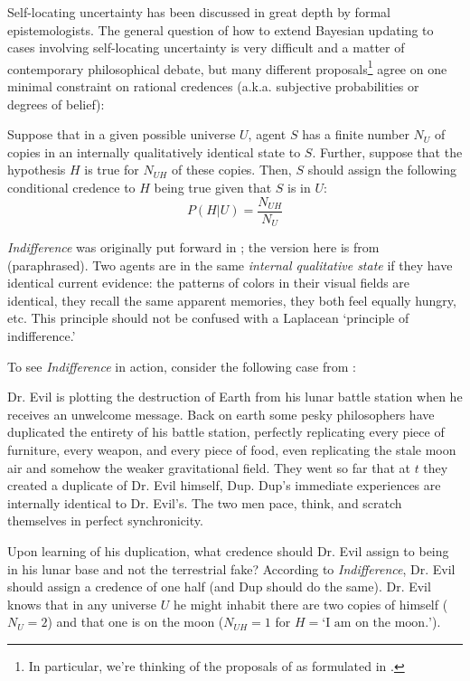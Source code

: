 \documentclass[12pt,onecolumn,secnumarabic,amsmath,amssymb,balancelastpage,nofootinbib]{article}
\begin{document}
Self-locating uncertainty has been discussed in great depth by formal epistemologists.  The general question of how to extend Bayesian updating to cases involving self-locating uncertainty is very difficult and a matter of contemporary philosophical debate, but many different proposals\footnote{In particular, we're thinking of the proposals of \citep{bostrom2002,meacham2008,ManleyF} as formulated in \citep{ManleyF}.}\label{listofproposals} agree on one minimal constraint on rational credences (a.k.a. subjective probabilities or degrees of belief):
\begin{description}[font=\normalfont\bfseries]
\item[Indifference] Suppose that in a given possible universe $U$, agent $S$ has a finite number $N_U$ of copies in an internally qualitatively identical state to $S$.  Further, suppose that the hypothesis $H$ is true for $N_{UH}$ of these copies.  Then, $S$ should assign the following conditional credence to $H$ being true given that $S$ is in $U$:
\begin{equation}
P(H|U)=\frac{N_{UH}}{N_U}
\label{}
\end{equation}
\end{description}
\emph{Indifference} was originally put forward in \citep{elga2004}; the version here is from \citep{ManleyF} (paraphrased).  Two agents are in the same \emph{internal qualitative state} if they have identical current evidence: the patterns of colors in their visual fields are identical, they recall the same apparent memories, they both feel equally hungry, etc.  This principle should not be confused with a Laplacean `principle of indifference.'

To see \emph{Indifference} in action, consider the following case from \citet{elga2004}:
\begin{description}[font=\normalfont\scshape]
\item[Duplicating Dr. Evil]  Dr. Evil is plotting the destruction of Earth from his lunar battle station when he receives an unwelcome message.  Back on earth some pesky philosophers have duplicated the entirety of his battle station, perfectly replicating every piece of furniture, every weapon, and every piece of food, even replicating the stale moon air and somehow the weaker gravitational field.  They went so far that at $t$ they created a duplicate of Dr. Evil himself, Dup.  Dup's immediate experiences are internally identical to Dr. Evil's.  The two men pace, think, and scratch themselves in perfect synchronicity.
\end{description}
Upon learning of his duplication, what credence should Dr. Evil assign to being in his lunar base and not the terrestrial fake?  According to \textit{Indifference}, Dr. Evil should assign a credence of one half (and Dup should do the same).  Dr. Evil knows that in any universe $U$ he might inhabit there are two copies of himself ($N_U=2$) and that one is on the moon ($N_{UH}=1$ for $H=\text{`I am on the moon.'}$).
\end{document}
